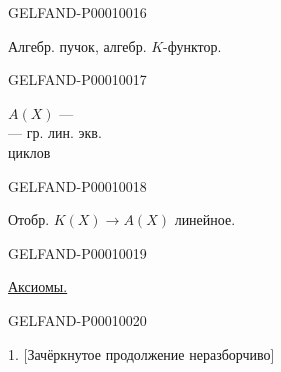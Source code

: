 \begin{GelfandAdjacentEvidence}{GELFAND-P000100}{16}


Алгебр. пучок, алгебр. $K$-функтор.

\end{GelfandAdjacentEvidence}
\begin{GelfandAdjacentEvidence}{GELFAND-P000100}{17}


\hfill\begin{minipage}{0.52\linewidth}$A(X)$ —\\— гр. лин. экв.\\\hspace*{18mm}циклов\end{minipage}

\end{GelfandAdjacentEvidence}
\begin{GelfandAdjacentEvidence}{GELFAND-P000100}{18}


Отобр. $K(X)\longrightarrow A(X)$ линейное.

\end{GelfandAdjacentEvidence}
\begin{GelfandAdjacentEvidence}{GELFAND-P000100}{19}


\underline{Аксиомы.}

\end{GelfandAdjacentEvidence}
\begin{GelfandAdjacentEvidence}{GELFAND-P000100}{20}


1. [Зачёркнутое продолжение неразборчиво]

\end{GelfandAdjacentEvidence}




